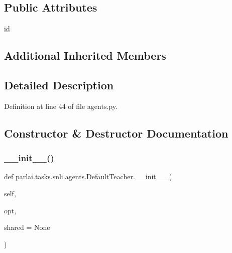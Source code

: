 \subsection*{Public Attributes}
\begin{DoxyCompactItemize}
\item 
\hyperlink{classparlai_1_1tasks_1_1snli_1_1agents_1_1DefaultTeacher_a53a712ad89d4c98e7501d2b307a6481c}{id}
\end{DoxyCompactItemize}
\subsection*{Additional Inherited Members}


\subsection{Detailed Description}


Definition at line 44 of file agents.\+py.



\subsection{Constructor \& Destructor Documentation}
\mbox{\label{classparlai_1_1tasks_1_1snli_1_1agents_1_1DefaultTeacher_a3712a548a459c659c30d811979bf07f0}} 
\subsubsection{\texorpdfstring{\+\_\+\+\_\+init\+\_\+\+\_\+()}{\_\_init\_\_()}}
{\footnotesize\ttfamily def parlai.\+tasks.\+snli.\+agents.\+Default\+Teacher.\+\_\+\+\_\+init\+\_\+\+\_\+ (\begin{DoxyParamCaption}\item[{}]{self,  }\item[{}]{opt,  }\item[{}]{shared = {\ttfamily None} }\end{DoxyParamCaption})}



